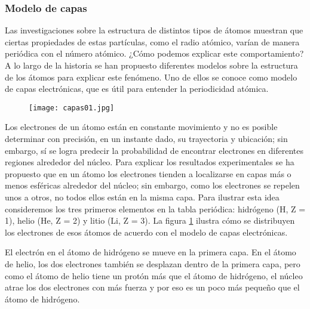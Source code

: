 \subsubsection{Modelo de capas}

Las investigaciones sobre la estructura de distintos tipos de átomos muestran que ciertas propiedades de estas partículas,
como el radio atómico, varían de manera periódica con el número atómico. ¿Cómo podemos explicar este comportamiento?
A lo largo de la historia se han propuesto diferentes modelos sobre la estructura de los átomos para explicar este fenómeno.
Uno de ellos se conoce como modelo de capas electrónicas, que es útil para entender la periodicidad atómica.


\begin{figure}[H]
    \centering
    \texttt{[image: capas01.jpg]}
    \label{fig:capas01}
\end{figure}

Los electrones de un átomo están en constante movimiento y no es posible determinar con precisión,
en un instante dado, su trayectoria y ubicación; sin embargo, sí se logra predecir la probabilidad de
encontrar electrones en diferentes regiones alrededor del núcleo. Para explicar los resultados
experimentales se ha propuesto que en un átomo los electrones tienden a localizarse en capas más o
menos esféricas alrededor del núcleo; sin embargo, como los electrones se repelen unos a otros, no
todos ellos están en la misma capa. Para ilustrar esta idea consideremos los tres primeros elementos
en la tabla periódica: hidrógeno (H, Z = 1), helio (He, Z = 2) y litio (Li, Z = 3).
La figura \ref{fig:capas01} ilustra cómo se distribuyen los electrones de esos átomos de acuerdo
con el modelo de capas electrónicas.



El electrón en el átomo de hidrógeno se mueve en la primera capa. En el átomo de helio, los dos electrones
también se desplazan dentro de la primera capa, pero como el átomo de helio tiene un protón más que el átomo
de hidrógeno, el núcleo atrae los dos electrones con más fuerza y por eso es un poco más pequeño que el átomo de hidrógeno.

